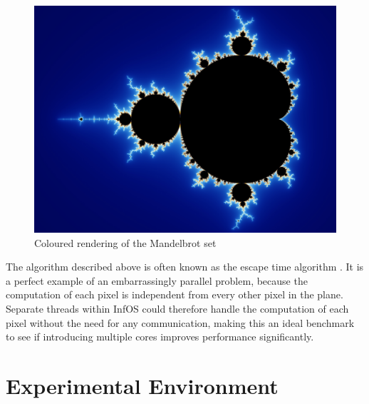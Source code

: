 \documentclass[bsc,frontabs,twoside,singlespacing,parskip,deptreport]{infthesis}     %
\begin{document}
\begin{figure}[h]
    \centering
    \includegraphics[scale=0.6]{mandelbrot.jpg}
    \caption{Coloured rendering of the Mandelbrot set \cite{mandelbrot-set}}
    \label{mandelbrot-vis}
\end{figure}

The algorithm described above is often known as the escape time algorithm \cite{mandelbrot-plotting-algorithms}. It is a perfect example of an embarrassingly parallel problem, because the computation of each pixel is independent from every other pixel in the plane. Separate threads within InfOS could therefore handle the computation of each pixel without the need for any communication, making this an ideal benchmark to see if introducing multiple cores improves performance significantly.

\section{Experimental Environment}
\end{document}
